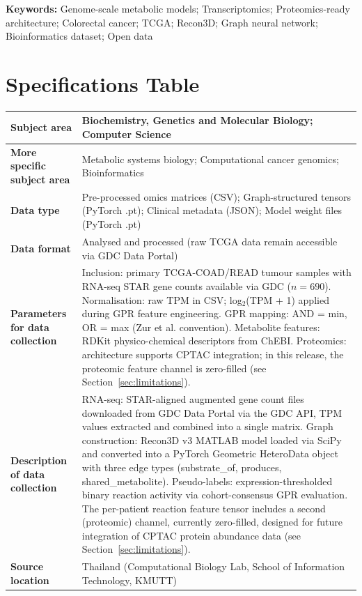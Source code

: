 \documentclass[12pt,a4paper]{article}
\begin{document}
\noindent\textbf{Keywords:} Genome-scale metabolic models; Transcriptomics; Proteomics-ready architecture; Colorectal cancer; TCGA; Recon3D; Graph neural network; Bioinformatics dataset; Open data

\section*{Specifications Table}

\noindent
\begin{tabularx}{\textwidth}{@{}p{3.5cm}X@{}}
\toprule
\textbf{Subject area} & Biochemistry, Genetics and Molecular Biology; Computer Science \\
\midrule
\textbf{More specific subject area} & Metabolic systems biology; Computational cancer genomics; Bioinformatics \\
\midrule
\textbf{Data type} & Pre-processed omics matrices (CSV); Graph-structured tensors (PyTorch .pt); Clinical metadata (JSON); Model weight files (PyTorch .pt) \\
\midrule
\textbf{Data format} & Analysed and processed (raw TCGA data remain accessible via GDC Data Portal) \\
\midrule
\textbf{Parameters for data collection} & Inclusion: primary TCGA-COAD/READ tumour samples with RNA-seq STAR gene counts available via GDC ($n = 690$). Normalisation: raw TPM in CSV; log$_2$(TPM + 1) applied during GPR feature engineering. GPR mapping: AND = min, OR = max (Zur et al. \cite{Zur2010} convention). Metabolite features: RDKit physico-chemical descriptors from ChEBI. Proteomics: architecture supports CPTAC integration; in this release, the proteomic feature channel is zero-filled (see Section~\ref{sec:limitations}). \\
\midrule
\textbf{Description of data collection} & RNA-seq: STAR-aligned augmented gene count files downloaded from GDC Data Portal via the GDC API, TPM values extracted and combined into a single matrix. Graph construction: Recon3D v3 MATLAB model loaded via SciPy and converted into a PyTorch Geometric HeteroData object with three edge types (substrate\_of, produces, shared\_metabolite). Pseudo-labels: expression-thresholded binary reaction activity via cohort-consensus GPR evaluation. The per-patient reaction feature tensor includes a second (proteomic) channel, currently zero-filled, designed for future integration of CPTAC protein abundance data (see Section~\ref{sec:limitations}). \\
\midrule
\textbf{Source location} & Thailand (Computational Biology Lab, School of Information Technology, KMUTT) \\

\end{tabularx}
\end{document}
